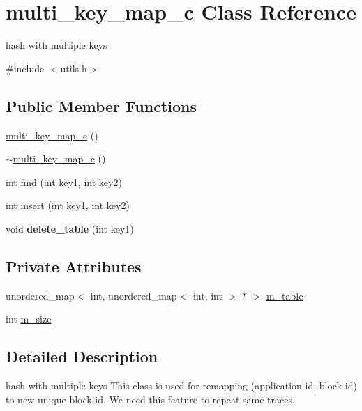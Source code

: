 \hypertarget{classmulti__key__map__c}{
\section{multi\_\-key\_\-map\_\-c Class Reference}
\label{classmulti__key__map__c}
}


hash with multiple keys  




{\ttfamily \#include $<$utils.h$>$}

\subsection*{Public Member Functions}
\begin{DoxyCompactItemize}
\item 
\hyperlink{classmulti__key__map__c_a10478aca09995a3572db5ece0f42b14b}{multi\_\-key\_\-map\_\-c} ()
\item 
\hyperlink{classmulti__key__map__c_abcce660edd4cc5d21b86b1efc61679cf}{$\sim$multi\_\-key\_\-map\_\-c} ()
\item 
int \hyperlink{classmulti__key__map__c_ab99cb6a05bb791560dca635328bee8a4}{find} (int key1, int key2)
\item 
int \hyperlink{classmulti__key__map__c_a71e80a3beb06b843f9ca94714e973ac3}{insert} (int key1, int key2)
\item 
\hypertarget{classmulti__key__map__c_a0e30025c7c55e3249f8e623054360d39}{
void {\bfseries delete\_\-table} (int key1)}
\label{classmulti__key__map__c_a0e30025c7c55e3249f8e623054360d39}

\end{DoxyCompactItemize}
\subsection*{Private Attributes}
\begin{DoxyCompactItemize}
\item 
unordered\_\-map$<$ int, unordered\_\-map$<$ int, int $>$ $\ast$ $>$ \hyperlink{classmulti__key__map__c_aba1b2934d007b3e4bd2c841c674b83e0}{m\_\-table}
\item 
int \hyperlink{classmulti__key__map__c_ad69aed9994fc585d4b4ef41f283995eb}{m\_\-size}
\end{DoxyCompactItemize}


\subsection{Detailed Description}
hash with multiple keys This class is used for remapping (application id, block id) to new unique block id. We need this feature to repeat same traces. 

